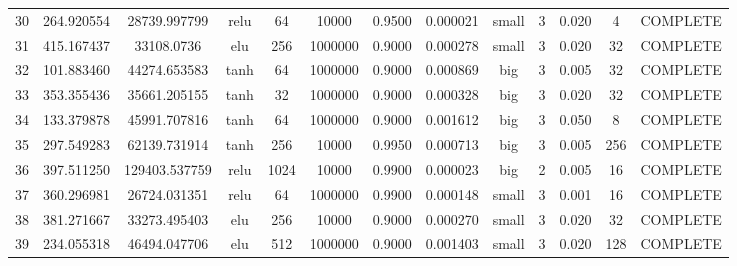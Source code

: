 \begin{longtable}{ccccccccccccc}
                       30 &                 264.920554 &                       28739.997799 &            relu &          64 &        10000 & 0.9500 &       0.000021 &     small &             3 & 0.020 &           4 & COMPLETE \\
                       31 &                 415.167437 &                         33108.0736 &             elu &         256 &      1000000 & 0.9000 &       0.000278 &     small &             3 & 0.020 &          32 & COMPLETE \\
                       32 &                 101.883460 &                       44274.653583 &            tanh &          64 &      1000000 & 0.9000 &       0.000869 &       big &             3 & 0.005 &          32 & COMPLETE \\
                       33 &                 353.355436 &                       35661.205155 &            tanh &          32 &      1000000 & 0.9000 &       0.000328 &       big &             3 & 0.020 &          32 & COMPLETE \\
                       34 &                 133.379878 &                       45991.707816 &            tanh &          64 &      1000000 & 0.9000 &       0.001612 &       big &             3 & 0.050 &           8 & COMPLETE \\
                       35 &                 297.549283 &                       62139.731914 &            tanh &         256 &        10000 & 0.9950 &       0.000713 &       big &             3 & 0.005 &         256 & COMPLETE \\
                       36 &                 397.511250 &                      129403.537759 &            relu &        1024 &        10000 & 0.9900 &       0.000023 &       big &             2 & 0.005 &          16 & COMPLETE \\
                       37 &                 360.296981 &                       26724.031351 &            relu &          64 &      1000000 & 0.9900 &       0.000148 &     small &             3 & 0.001 &          16 & COMPLETE \\
                       38 &                 381.271667 &                       33273.495403 &             elu &         256 &        10000 & 0.9000 &       0.000270 &     small &             3 & 0.020 &          32 & COMPLETE \\
                       39 &                 234.055318 &                       46494.047706 &             elu &         512 &      1000000 & 0.9000 &       0.001403 &     small &             3 & 0.020 &         128 & COMPLETE \\

\end{longtable}
